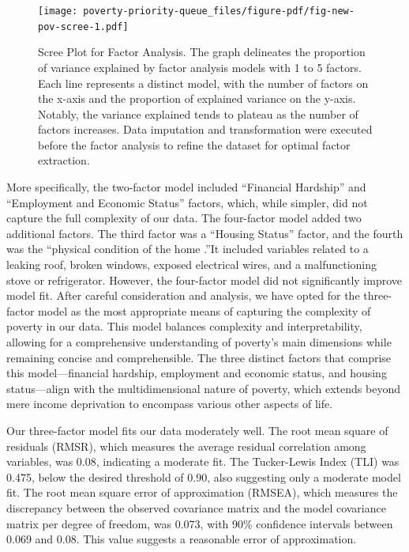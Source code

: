 \documentclass[
]{article}
\begin{document}
\begin{figure}

{\centering \texttt{[image: poverty-priority-queue\_files/figure-pdf/fig-new-pov-scree-1.pdf]}

}

\caption{\label{fig-new-pov-scree}Scree Plot for Factor Analysis. The
graph delineates the proportion of variance explained by factor analysis
models with 1 to 5 factors. Each line represents a distinct model, with
the number of factors on the x-axis and the proportion of explained
variance on the y-axis. Notably, the variance explained tends to plateau
as the number of factors increases. Data imputation and transformation
were executed before the factor analysis to refine the dataset for
optimal factor extraction.}

\end{figure}

More specifically, the two-factor model included ``Financial Hardship''
and ``Employment and Economic Status'' factors, which, while simpler,
did not capture the full complexity of our data. The four-factor model
added two additional factors. The third factor was a ``Housing Status''
factor, and the fourth was the ``physical condition of the home .''It
included variables related to a leaking roof, broken windows, exposed
electrical wires, and a malfunctioning stove or refrigerator. However,
the four-factor model did not significantly improve model fit. After
careful consideration and analysis, we have opted for the three-factor
model as the most appropriate means of capturing the complexity of
poverty in our data. This model balances complexity and
interpretability, allowing for a comprehensive understanding of
poverty's main dimensions while remaining concise and comprehensible.
The three distinct factors that comprise this model---financial
hardship, employment and economic status, and housing status---align
with the multidimensional nature of poverty, which extends beyond mere
income deprivation to encompass various other aspects of life.

Our three-factor model fits our data moderately well. The root mean
square of residuals (RMSR), which measures the average residual
correlation among variables, was 0.08, indicating a moderate fit. The
Tucker-Lewis Index (TLI) was 0.475, below the desired threshold of 0.90,
also suggesting only a moderate model fit. The root mean square error of
approximation (RMSEA), which measures the discrepancy between the
observed covariance matrix and the model covariance matrix per degree of
freedom, was 0.073, with 90\% confidence intervals between 0.069 and
0.08. This value suggests a reasonable error of approximation.
\end{document}
